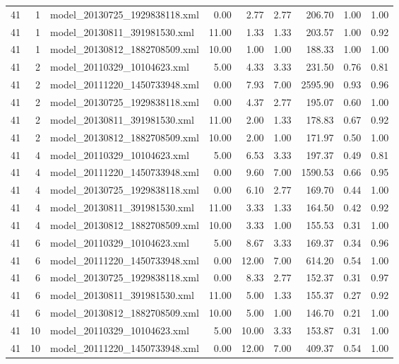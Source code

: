 \begin{table}[ht]
\begin{tabular}{rrlrrrrrr}
   41 &   1 & model\_20130725\_1929838118.xml & 0.00 & 2.77 & 2.77 & 206.70 & 1.00 & 1.00 \\ 
   41 &   1 & model\_20130811\_391981530.xml & 11.00 & 1.33 & 1.33 & 203.57 & 1.00 & 0.92 \\ 
   41 &   1 & model\_20130812\_1882708509.xml & 10.00 & 1.00 & 1.00 & 188.33 & 1.00 & 1.00 \\ 
   41 &   2 & model\_20110329\_10104623.xml & 5.00 & 4.33 & 3.33 & 231.50 & 0.76 & 0.81 \\ 
   41 &   2 & model\_20111220\_1450733948.xml & 0.00 & 7.93 & 7.00 & 2595.90 & 0.93 & 0.96 \\ 
   41 &   2 & model\_20130725\_1929838118.xml & 0.00 & 4.37 & 2.77 & 195.07 & 0.60 & 1.00 \\ 
   41 &   2 & model\_20130811\_391981530.xml & 11.00 & 2.00 & 1.33 & 178.83 & 0.67 & 0.92 \\ 
   41 &   2 & model\_20130812\_1882708509.xml & 10.00 & 2.00 & 1.00 & 171.97 & 0.50 & 1.00 \\ 
   41 &   4 & model\_20110329\_10104623.xml & 5.00 & 6.53 & 3.33 & 197.37 & 0.49 & 0.81 \\ 
   41 &   4 & model\_20111220\_1450733948.xml & 0.00 & 9.60 & 7.00 & 1590.53 & 0.66 & 0.95 \\ 
   41 &   4 & model\_20130725\_1929838118.xml & 0.00 & 6.10 & 2.77 & 169.70 & 0.44 & 1.00 \\ 
   41 &   4 & model\_20130811\_391981530.xml & 11.00 & 3.33 & 1.33 & 164.50 & 0.42 & 0.92 \\ 
   41 &   4 & model\_20130812\_1882708509.xml & 10.00 & 3.33 & 1.00 & 155.53 & 0.31 & 1.00 \\ 
   41 &   6 & model\_20110329\_10104623.xml & 5.00 & 8.67 & 3.33 & 169.37 & 0.34 & 0.96 \\ 
   41 &   6 & model\_20111220\_1450733948.xml & 0.00 & 12.00 & 7.00 & 614.20 & 0.54 & 1.00 \\ 
   41 &   6 & model\_20130725\_1929838118.xml & 0.00 & 8.33 & 2.77 & 152.37 & 0.31 & 0.97 \\ 
   41 &   6 & model\_20130811\_391981530.xml & 11.00 & 5.00 & 1.33 & 155.37 & 0.27 & 0.92 \\ 
   41 &   6 & model\_20130812\_1882708509.xml & 10.00 & 5.00 & 1.00 & 146.70 & 0.21 & 1.00 \\ 
   41 &  10 & model\_20110329\_10104623.xml & 5.00 & 10.00 & 3.33 & 153.87 & 0.31 & 1.00 \\ 
   41 &  10 & model\_20111220\_1450733948.xml & 0.00 & 12.00 & 7.00 & 409.37 & 0.54 & 1.00 \\ 

\end{tabular}
\end{table}
